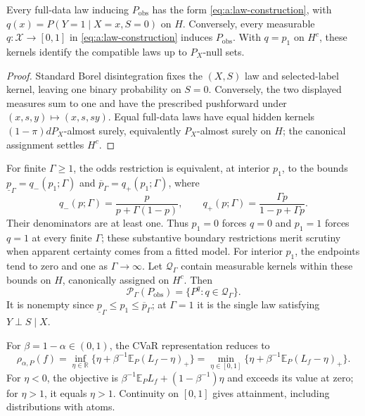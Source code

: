 \begin{lemma}
\label{lemma:a:kernels}
Every full-data law inducing $P_{\mathrm{obs}}$ has the form \eqref{eq:a:law-construction}, with $q(x)=P(Y=1\mid X=x,S=0)$ on $H$. Conversely, every measurable $q:\mathcal X\to[0,1]$ in \eqref{eq:a:law-construction} induces $P_{\mathrm{obs}}$. With $q=p_1$ on $H^c$, these kernels identify the compatible laws up to $P_X$-null sets.
\end{lemma}

\begin{proof}
Standard Borel disintegration fixes the $(X,S)$ law and selected-label kernel, leaving one binary probability on $S=0$. Conversely, the two displayed measures sum to one and have the prescribed pushforward under $(x,s,y)\mapsto(x,s,sy)$. Equal full-data laws have equal hidden kernels $(1-\pi)dP_X$-almost surely, equivalently $P_X$-almost surely on $H$; the canonical assignment settles $H^c$.
\end{proof}

For finite $\Gamma\geq1$, the odds restriction is equivalent, at interior $p_1$, to the bounds $\underline p_\Gamma=q_-(p_1;\Gamma)$ and $\overline p_\Gamma=q_+(p_1;\Gamma)$, where
\begin{equation}
q_-(p;\Gamma)=\frac{p}{p+\Gamma(1-p)},\qquad
q_+(p;\Gamma)=\frac{\Gamma p}{1-p+\Gamma p}.
\label{eq:a:sensitivity-maps}
\end{equation}
Their denominators are at least one. Thus $p_1=0$ forces $q=0$ and $p_1=1$ forces $q=1$ at every finite $\Gamma$; these substantive boundary restrictions merit scrutiny when apparent certainty comes from a fitted model. For interior $p_1$, the endpoints tend to zero and one as $\Gamma\to\infty$. Let $\mathcal Q_\Gamma$ contain measurable kernels within these bounds on $H$, canonically assigned on $H^c$. Then
\begin{equation}
\mathcal P_\Gamma(P_{\mathrm{obs}})=\{P^q:q\in\mathcal Q_\Gamma\}.
\label{eq:a:compatible-class}
\end{equation}
It is nonempty since $\underline p_\Gamma\leq p_1\leq\overline p_\Gamma$; at $\Gamma=1$ it is the single law satisfying $Y\perp S\mid X$.

For $\beta=1-\alpha\in(0,1)$, the CVaR representation \citep{rockafellar2002conditional} reduces to
\begin{equation}
\rho_{\alpha,P}(f)=\inf_{\eta\in\mathbb R}\{\eta+\beta^{-1}\mathbb E_P(L_f-\eta)_+\}
=\min_{\eta\in[0,1]}\{\eta+\beta^{-1}\mathbb E_P(L_f-\eta)_+\}.
\label{eq:a:ru}
\end{equation}
For $\eta<0$, the objective is $\beta^{-1}\mathbb E_PL_f+(1-\beta^{-1})\eta$ and exceeds its value at zero; for $\eta>1$, it equals $\eta>1$. Continuity on $[0,1]$ gives attainment, including distributions with atoms.


